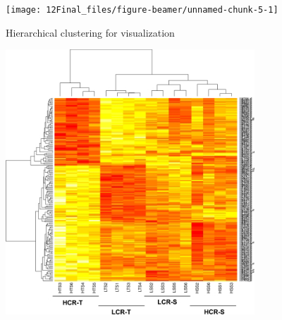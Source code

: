 \documentclass[10pt,ignorenonframetext,]{beamer}
\begin{document}
\begin{frame}

\centering

\texttt{[image: 12Final\_files/figure-beamer/unnamed-chunk-5-1]}

\end{frame}

\begin{frame}

Hierarchical clustering for visualization

\centering

\includegraphics[width=0.7\textwidth,height=\textheight]{../1Intro/heatmap.png}

\end{frame}
\end{document}
